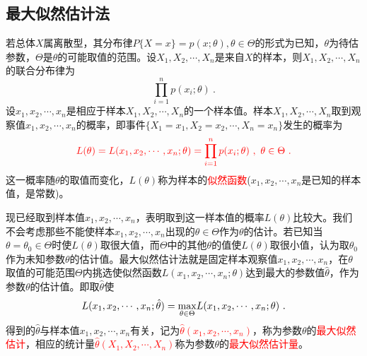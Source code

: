 \documentclass[12pt,a4paper]{article}
\begin{document}
\subsection{最大似然估计法}
若总体$X$属离散型，其分布律$P\{X=x\} = p(x;\theta), \theta \in \Theta$的形式为已知，$\theta$为待估参数，$\Theta$是$\theta$的可能取值的范围。设$X_1, X_2, \cdots, X_n$是来自$X$的样本，则$X_1, X_2, \cdots, X_n$的联合分布律为
\begin{equation*}
\prod_{i=1}^n p(x_i;\theta) ~.
\end{equation*}
设$x_1, x_2, \cdots, x_n$是相应于样本$X_1, X_2, \cdots, X_n$的一个样本值。样本$X_1, X_2, \cdots, X_n$取到观察值$x_1, x_2, \cdots, x_n$的概率，即事件$\{X_1 = x_1, X_2 = x_2, \cdots, X_n = x_n\}$发生的概率为
\begin{equation}
\color{red} L(\theta) = L(x_1, x_2, \cdots, x_n;\theta) = \prod_{i=1}^n p(x_i;\theta) ~, ~\theta \in \Theta ~.
\end{equation}
这一概率随$\theta$的取值而变化，$L(\theta)$称为样本的\textcolor{red}{似然函数}($x_1, x_2, \cdots, x_n$是已知的样本值，是常数)。

现已经取到样本值$x_1, x_2, \cdots, x_n$，表明取到这一样本值的概率$L(\theta)$比较大。我们不会考虑那些不能使样本$x_1, x_2, \cdots, x_n$出现的$\theta\in \Theta$作为$\theta$的估计。若已知当$\theta=\theta_0 \in \Theta$时使$L(\theta)$取很大值，而$\Theta$中的其他$\theta$的值使$L(\theta)$取很小值，认为取$\theta_0$作为未知参数$\theta$的估计值。最大似然估计法就是固定样本观察值$x_1, x_2, \cdots, x_n$，在$\theta$取值的可能范围$\Theta$内挑选使似然函数$L(x_1, x_2, \cdots, x_n;\theta)$达到最大的参数值$\hat{\theta}$，作为参数$\theta$的估计值。即取$\hat{\theta}$使
\begin{equation}
L(x_1, x_2, \cdots, x_n;\hat{\theta}) = \underset{\theta\in \Theta}{\rm max} L(x_1, x_2, \cdots, x_n;\theta) ~.
\end{equation}
得到的$\hat{\theta}$与样本值$x_1, x_2, \cdots, x_n$有关，记为\textcolor{red}{$\hat{\theta}(x_1, x_2, \cdots, x_n)$}，称为参数$\theta$的\textcolor{red}{最大似然估计}，相应的统计量\textcolor{red}{$\hat{\theta}(X_1, X_2, \cdots, X_n)$}称为参数$\theta$的\textcolor{red}{最大似然估计量}。
\end{document}
